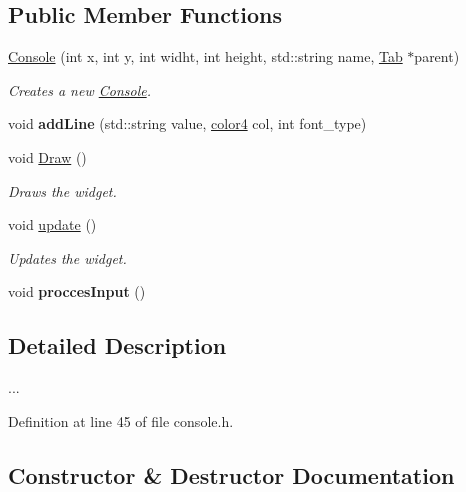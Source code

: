\subsection*{Public Member Functions}
\begin{DoxyCompactItemize}
\item 
\hyperlink{class_console_ac3c8107e78fe0a576627dfd49a057525}{Console} (int x, int y, int widht, int height, std\+::string name, \hyperlink{class_tab}{Tab} $\ast$parent)
\begin{DoxyCompactList}\small\item\em Creates a new \hyperlink{class_console}{Console}. \end{DoxyCompactList}\item 
\mbox{\label{class_console_a8331885826f3df1f421622396b77545a}} 
void {\bfseries add\+Line} (std\+::string value, \hyperlink{structcolor4}{color4} col, int font\+\_\+type)
\item 
void \hyperlink{class_console_a083e9f4f93ae7261dba07c8559db4443}{Draw} ()
\begin{DoxyCompactList}\small\item\em Draws the widget. \end{DoxyCompactList}\item 
void \hyperlink{class_console_af1d3a54bd8649b46574ad35998563fea}{update} ()
\begin{DoxyCompactList}\small\item\em Updates the widget. \end{DoxyCompactList}\item 
\mbox{\label{class_console_a9c69ceb75eba499a429833d818a62c73}} 
void {\bfseries procces\+Input} ()
\end{DoxyCompactItemize}


\subsection{Detailed Description}
... 

Definition at line 45 of file console.\+h.



\subsection{Constructor \& Destructor Documentation}
\mbox{\label{class_console_ac3c8107e78fe0a576627dfd49a057525}} 
